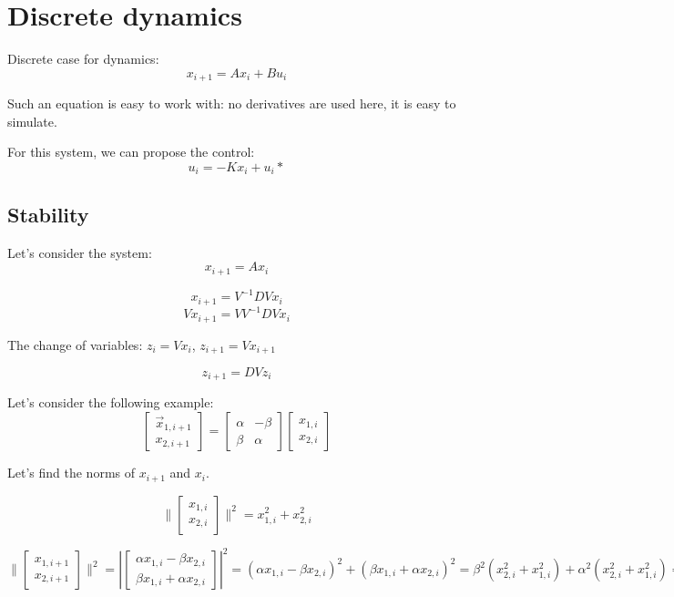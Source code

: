 \section{Discrete dynamics}

Discrete case for dynamics:
\[x_{i+1} = Ax_i +  Bu_i\]

Such an equation is easy to work with: no derivatives are used here, it is easy to simulate. 

For this system, we can propose the control: \[u_i = -Kx_i + u_i*\]
\subsection{Stability}

Let's consider the system:
\[x_{i+1} = A x_i\]

\[x_{i+1} = V^{-1}DV x_i\]
\[V x_{i+1} = V V^{-1}DV x_i\]

The change of variables:
$z_{i} = V x_{i}$, $z_{i+1} = V x_{i+1}$

\[z_{i+1} = DV z_i\]

Let's consider the following example:
\[
\begin{bmatrix}
\vec{x}_{1,i+1} \\
x_{2, i+1}
\end{bmatrix}
=
\begin{bmatrix}
\alpha & -\beta \\
\beta & \alpha
\end{bmatrix}
\begin{bmatrix}
x_{1, i} \\
x_{2, i}
\end{bmatrix}
\]

Let's find the norms of \(x_{i+1}\) and \(x_i\).

\[
\| \begin{bmatrix}
x_{1, i} \\
x_{2, i}
\end{bmatrix}
\|^2 = x_{1, i}^2 + x_{2, i}^2
\]

\[
\| \begin{bmatrix}
x_{1, i+1} \\
x_{2, i+1}
\end{bmatrix}
\|^2 = \left| \begin{bmatrix}
\alpha x_{1, i} - \beta x_{2, i} \\
\beta x_{1, i} + \alpha x_{2, i}
\end{bmatrix} \right|^2
= (\alpha x_{1, i} - \beta x_{2, i})^2 + (\beta x_{1, i} + \alpha x_{2, i})^2 
= \beta^2 (x_{2,i}^2 + x_{1,i}^2) + \alpha^2 (x_{2,i}^2 + x_{1,i}^2)
= (\alpha^2 + \beta^2) (x_{1, i}^2 + x_{2, i}^2)
\]



